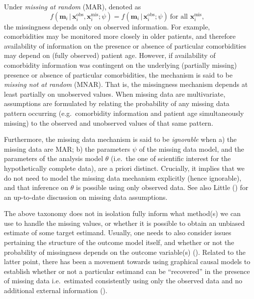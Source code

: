 \documentclass[
  letterpaper,
  paper=240mm:170mm,
  twoside=true,
  open=right,
  fontsize=10pt,
  pagesize=false,
  BCOR=15mm,
  DIV=14,
  headinclude=true,
  footinclude=false,
  headsepline=on]{scrbook}
\newcommand{\given}{\,|\,}
\begin{document}
Under \emph{missing at random} (MAR), denoted as \[
f(\mathbf{m}_i \given \mathbf{x}_i^{\text{obs}},\mathbf{x}_i^{\text{mis}};\psi) = f(\mathbf{m}_i \given \mathbf{x}_i^{\text{obs}}; \psi) \ \text{for all } \mathbf{x}_i^{\text{mis}},
\] the missingness depends only on observed information. For example,
comorbidities may be monitored more closely in older patients, and
therefore availability of information on the presence or absence of
particular comorbidities may depend on (fully observed) patient age.
However, if availability of comorbidity information was contingent on
the underlying (partially missing) presence or absence of particular
comorbidities, the mechanism is said to be \emph{missing not at random}
(MNAR). That is, the missingness mechanism depends at least partially on
unobserved values. When missing data are multivariate, assumptions are
formulated by relating the probability of any missing data pattern
occurring (e.g.~comorbidity information and patient age simultaneously
missing) to the observed and unobserved values of that same pattern.

Furthermore, the missing data mechanism is said to be \emph{ignorable}
when a) the missing data are MAR; b) the parameters \(\psi\) of the
missing data model, and the parameters of the analysis model \(\theta\)
(i.e.~the one of scientific interest for the hypothetically complete
data), are a priori distinct. Crucially, it implies that we do not need
to model the missing data mechanism explicitly (hence ignorable), and
that inference on \(\theta\) is possible using only observed data. See
also Little () for
an up-to-date discussion on missing data assumptions.

The above taxonomy does not in isolation fully inform what method(s) we
can use to handle the missing values, or whether it is possible to
obtain an unbiased estimate of some target estimand. Usually, one needs
to also consider issues pertaining the structure of the outcome model
itself, and whether or not the probability of missingness depends on the
outcome variable(s)
(). Related to the latter point, there has been a movement towards
using graphical causal models to establish whether or not a particular
estimand can be ``recovered'' in the presence of missing data
i.e.~estimated consistently using only the observed data and no
additional external information
().
\end{document}
